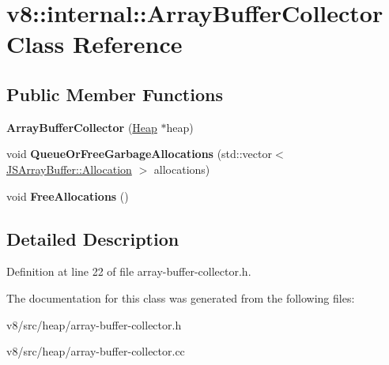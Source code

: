 \hypertarget{classv8_1_1internal_1_1ArrayBufferCollector}{}\section{v8\+:\+:internal\+:\+:Array\+Buffer\+Collector Class Reference}
\label{classv8_1_1internal_1_1ArrayBufferCollector}
\subsection*{Public Member Functions}
\begin{DoxyCompactItemize}
\item 
\mbox{\label{classv8_1_1internal_1_1ArrayBufferCollector_a20f3bf26dc3d5865028f1e726f1c8612}} 
{\bfseries Array\+Buffer\+Collector} (\mbox{\hyperlink{classv8_1_1internal_1_1Heap}{Heap}} $\ast$heap)
\item 
\mbox{\label{classv8_1_1internal_1_1ArrayBufferCollector_a41a06629ee7a033d07e0e24119e0332d}} 
void {\bfseries Queue\+Or\+Free\+Garbage\+Allocations} (std\+::vector$<$ \mbox{\hyperlink{structv8_1_1internal_1_1JSArrayBuffer_1_1Allocation}{J\+S\+Array\+Buffer\+::\+Allocation}} $>$ allocations)
\item 
\mbox{\label{classv8_1_1internal_1_1ArrayBufferCollector_a6de54ccb49b8225bc31db141ea38c127}} 
void {\bfseries Free\+Allocations} ()
\end{DoxyCompactItemize}


\subsection{Detailed Description}


Definition at line 22 of file array-\/buffer-\/collector.\+h.



The documentation for this class was generated from the following files\+:\begin{DoxyCompactItemize}
\item 
v8/src/heap/array-\/buffer-\/collector.\+h\item 
v8/src/heap/array-\/buffer-\/collector.\+cc\end{DoxyCompactItemize}
